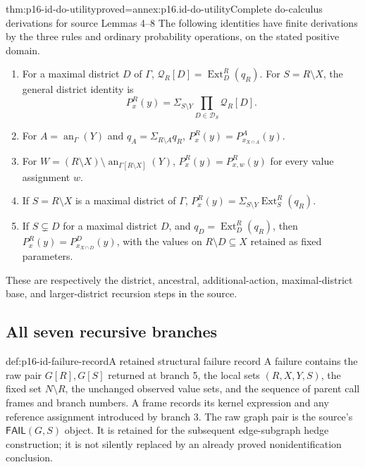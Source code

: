 \begin{hbtheorem}{thm:p16-id-do-utility}{proved=annex:p16.id-do-utility}{Complete do-calculus derivations for source Lemmas 4--8}
The following identities have finite derivations by the three rules
and ordinary probability operations, on the stated positive domain.
\begin{enumerate}
\item For a maximal district \(D\) of \(\Gamma\),
      \(\mathcal Q_R[D]=\operatorname{Ext}^R_D(q_R)\).
      For \(S=R\setminus X\), the general district identity is
      \[
       P^R_x(y)=\Sigma_{S\setminus Y}
               \prod_{D\in\mathcal D_S}\mathcal Q_R[D].
      \]
\item For \(A=\operatorname{an}_{\Gamma}(Y)\) and
      \(q_A=\Sigma_{R\setminus A}q_R\),
      \(P^R_x(y)=P^A_{x_{X\cap A}}(y)\).
\item For \(W=(R\setminus X)\setminus
      \operatorname{an}_{\Gamma[R\setminus X]}(Y)\),
      \(P^R_x(y)=P^R_{x,w}(y)\) for every value assignment \(w\).
\item If \(S=R\setminus X\) is a maximal district of \(\Gamma\),
      \(P^R_x(y)=\Sigma_{S\setminus Y}\operatorname{Ext}^R_S(q_R)\).
\item If \(S\subsetneq D\) for a maximal district \(D\), and
      \(q_D=\operatorname{Ext}^R_D(q_R)\), then
      \(P^R_x(y)=P^D_{x_{X\cap D}}(y)\), with the values on
      \(R\setminus D\subseteq X\) retained as fixed parameters.
\end{enumerate}
These are respectively the district, ancestral, additional-action,
maximal-district base, and larger-district recursion steps in the source.
\end{hbtheorem}

\subsection{All seven recursive branches}

\begin{hbdefinition}{def:p16-id-failure-record}{A retained structural failure record}
A failure contains the raw pair \(G[R],G[S]\) returned at
branch 5, the local sets \((R,X,Y,S)\), the fixed set
\(N\setminus R\), the unchanged observed value sets, and the
sequence of parent call frames and branch numbers. A frame records
its kernel expression and any reference assignment introduced by
branch 3. The raw graph pair is the source's
\(\mathsf{FAIL}(G,S)\) object. It is retained for the subsequent
edge-subgraph hedge construction; it is not silently replaced by
an already proved nonidentification conclusion.
\end{hbdefinition}

